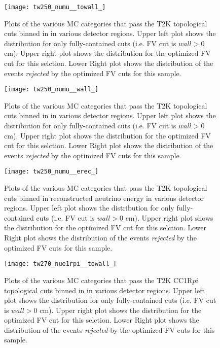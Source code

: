 \begin{figure}[h]
  \begin{center}
    \texttt{[image: tw250\_numu\_\_towall\_]}
  \end{center}
  \caption{Plots of the various MC categories that pass the T2K \numu
  topological cuts binned in \towall in various detector regions. Upper left
  plot shows the distribution for only fully-contained cuts (i.e. FV cut is \@ $wall > 0$ cm).
  Upper right plot shows the distribution for the optimized FV cut for this selction.
  Lower Right plot shows the distribution of the events \emph{rejected} by the optimized
  FV cuts for this sample.
  }
  \label{fig:compnumutowall}
\end{figure}


\begin{figure}[h]
  \begin{center}
    \texttt{[image: tw250\_numu\_\_wall\_]}
  \end{center}
  \caption{Plots of the various MC categories that pass the T2K \numu
  topological cuts binned in \wall in various detector regions. Upper left
  plot shows the distribution for only fully-contained cuts (i.e. FV cut is \@ $wall > 0$ cm).
  Upper right plot shows the distribution for the optimized FV cut for this selction.
  Lower Right plot shows the distribution of the events \emph{rejected} by the optimized
  FV cuts for this sample.
  }
  \label{fig:compnumuwall}
\end{figure}


\begin{figure}[h]
  \begin{center}
    \texttt{[image: tw250\_numu\_\_erec\_]}
  \end{center}
  \caption{Plots of the various MC categories that pass the T2K \numu
  topological cuts binned in reconstructed neutrino energy in various detector
  regions. Upper left plot shows the distribution for only fully-contained cuts
  (i.e. FV cut is \@ $wall > 0$ cm).  Upper right plot shows the distribution
  for the optimized FV cut for this selction.  Lower Right plot shows the
  distribution of the events \emph{rejected} by the optimized FV cuts for this
  sample.
  }
  \label{fig:compnumuerec}
\end{figure}


\begin{figure}[h]
  \begin{center}
    \texttt{[image: tw270\_nue1rpi\_\_towall\_]}
  \end{center}
  \caption{Plots of the various MC categories that pass the T2K  \nue CC1R$pi$
  topological cuts binned in \towall in various detector regions. Upper left
  plot shows the distribution for only fully-contained cuts (i.e. FV cut is \@ $wall > 0$ cm).
  Upper right plot shows the distribution for the optimized FV cut for this selction.
  Lower Right plot shows the distribution of the events \emph{rejected} by the optimized
  FV cuts for this sample.
  }
  \label{fig:compnue1rpitowall}
\end{figure}


